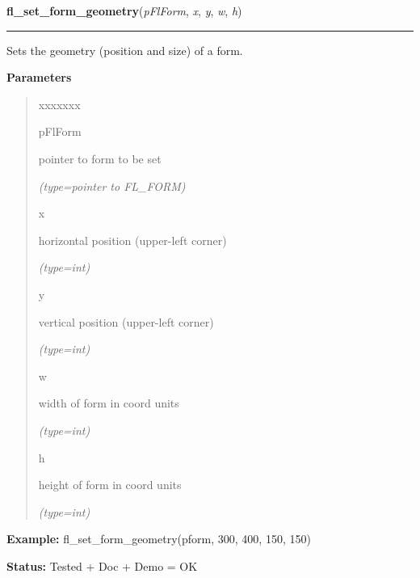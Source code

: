     \vspace{0.5ex}

\hspace{.8\funcindent}\begin{boxedminipage}{\funcwidth}

    \raggedright \textbf{fl\_set\_form\_geometry}(\textit{pFlForm}, \textit{x}, \textit{y}, \textit{w}, \textit{h})

    \vspace{-1.5ex}

    \rule{\textwidth}{0.5\fboxrule}
\setlength{\parskip}{2ex}
    Sets the geometry (position and size) of a form.

\setlength{\parskip}{1ex}
      \textbf{Parameters}
      \vspace{-1ex}

      \begin{quote}
        \begin{Ventry}{xxxxxxx}

          \item[pFlForm]

          pointer to form to be set

            {\it (type=pointer to FL\_FORM)}

          \item[x]

          horizontal position (upper-left corner)

            {\it (type=int)}

          \item[y]

          vertical position (upper-left corner)

            {\it (type=int)}

          \item[w]

          width of form in coord units

            {\it (type=int)}

          \item[h]

          height of form in coord units

            {\it (type=int)}

        \end{Ventry}

      \end{quote}

\textbf{Example:} fl\_set\_form\_geometry(pform, 300, 400, 150, 150)



\textbf{Status:} Tested + Doc + Demo = OK



    \end{boxedminipage}

